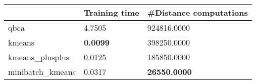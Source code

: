 \begin{table}[htbp]
\centering
\begin{tabular}{lll}
\toprule
 & Training time & #Distance computations \\
\midrule
qbca & 4.7505 & 924816.0000 \\
kmeans & \textbf{0.0099} & 398250.0000 \\
kmeans_plusplus & 0.0125 & 185850.0000 \\
minibatch_kmeans & 0.0317 & \textbf{26550.0000} \\
\bottomrule
\end{tabular}
\end{table}
